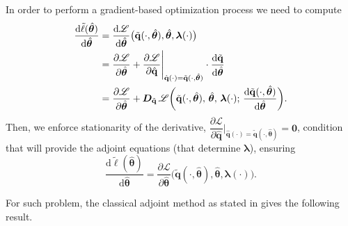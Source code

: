 In order to perform a gradient-based optimization process we need to compute\\
\begin{align}\label{eq:ltildeder}
    \dv{\tilde{\ell}(\hat{\bm{\theta}})}{\hat{\bm{\theta}}} &= \dv{\mathscr{L}}{\hat{\bm{\theta}}} \bigl(\tilde{\mathbf{q}}(\cdot,\hat{\bm{\theta}}),\hat{\bm{\theta}},\bm{\lambda}(\cdot)\bigr) \\
    &= \dfrac{\partial\mathscr{L}}{\partial\hat{\bm{\theta}}} + \dfrac{\partial\mathscr{L}}{\partial\hat{\mathbf{q}}}\Bigg\vert_{\hat{\mathbf{q}}(\cdot) = \tilde{\mathbf{q}}(\cdot, \hat{\bm{\theta}} ) }\cdot \dfrac{\textrm{d}\tilde{\mathbf{q}}}{\textrm{d}\hat{\bm{\theta}}} \notag\\
    &= 
  \frac{\partial\mathscr{L}}{\partial \hat{\bm{\theta}}}+
  \bm{D}_{\tilde{\mathbf{q}}}\,\mathscr{L}\biggl(\tilde{\mathbf{q}}(\cdot,\hat{\bm{\theta}}),\,\hat{\bm{\theta}},\,\bm{\lambda}(\cdot);\,
    \dv{\tilde{\mathbf{q}}(\cdot,\hat{\bm{\theta}})}{\hat{\bm{\theta}}}
  \biggr).\notag
\end{align}
Then, we enforce stationarity of the derivative, $\dfrac{\partial\mathscr{L}}{\partial\hat{\mathbf{q}}}\Bigg\vert_{\hat{\mathbf{q}}(\cdot) = \tilde{\mathbf{q}}(\cdot, \hat{\bm{\theta}} ) } = \bm{0}$, condition that will provide the adjoint equations (that determine $\bm{\lambda}$), ensuring\\
\begin{equation}
  \label{eq:equal_grad}
  \frac{\mathrm{d}\tilde{\ell}(\hat{\bm{\theta}})}{\mathrm{d}\hat{\bm{\theta}}}
  = \frac{\partial\mathscr{L}}{\partial\hat{\bm{\theta}}}(\tilde{\mathbf{q}}(\cdot,\hat{\bm{\theta}}),\hat{\bm{\theta}},\bm{\lambda}(\cdot)\bigr).
\end{equation}

For such problem, the classical adjoint method as stated in \cite{bradley2024pde,luchini2024introduction} gives the following result.

